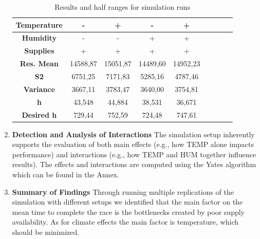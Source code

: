\documentclass[conference]{IEEEtran}
\begin{document}
\begin{enumerate}
    \begin{table}[]
    \caption{Results and half ranges for simulation runs}
    \begin{center}
    \begin{tabular}{|c|c|c|c|c|c|c|c|c|}
    \hline
    \textbf{Temperature} & - & + & - & + \\
    \hline
    \textbf{Humidity} & - & - & + & + \\
    \hline
    \textbf{Supplies} &+&+&+&+ \\
    \hline
    \textbf{Res. Mean} & 14588,87&15051,87&14489,60&14952,23 \\
    \hline
    \textbf{S2}& 6751,25&7171,83&5285,16&4787,46 \\
    \hline
    \textbf{Variance}&3667,11&3783,47&3640,00&3754,81\\
    \hline
    \textbf{h}&43,548&44,884&38,531&36,671\\
    \hline
    \textbf{Desired h}&729,44&752,59&724,48&747,61\\
    \hline
    \end{tabular}
    \label{tab:rep_significance_2}
    \end{center}
    \end{table}

    \item \textbf{Detection and Analysis of Interactions}
    The simulation setup inherently supports the evaluation of both main effects (e.g., how TEMP alone impacts performance) and interactions (e.g., how TEMP and HUM together influence results). The effects and interactions are computed using the Yates algorithm which can be found in the Annex.
    \item \textbf{Summary of Findings}
    Through running multiple replications of the simulation with different setups we identified that the main factor on the mean time to complete the race is the bottlenecks created by poor supply availability. As for climate effects the main factor is temperature, which should be minimized.
\end{enumerate}
\end{document}
